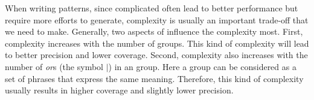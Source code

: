 When writing \RE patterns, since complicated \REs often lead to better performance but require more efforts to generate, \RE complexity is usually an important trade-off that we need to make. Generally, two aspects of \RE influence the complexity most. First, \RE complexity increases with the number of \RE groups. This kind of complexity will lead to better precision and lower coverage. Second, \RE complexity also increases with the number of \emph{or}s (the symbol $|$) in an \RE group. Here a group can be considered as a set of phrases that express the same meaning. Therefore, this kind of complexity usually results in higher coverage and slightly lower precision.

